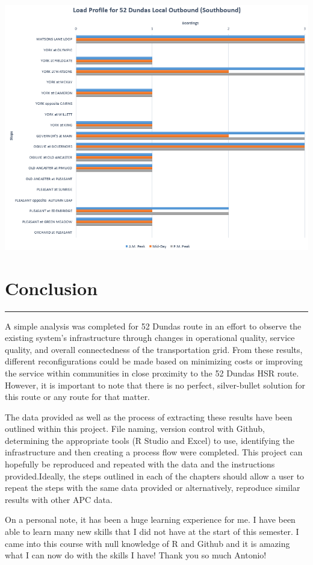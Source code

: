 \documentclass[
11pt, %
oneside, %
english, %
singlespacing, %
]{macthesis} %
\begin{document}
\includegraphics[width=1\linewidth]{figure/Load_Profile_Southbound}

\hypertarget{conclusion}{%
\chapter{Conclusion}\label{conclusion}}
\begin{center}\rule{0.5\linewidth}{0.5pt}\end{center}

A simple analysis was completed for 52 Dundas route in an effort to observe the existing system's infrastructure through changes in operational quality, service quality, and overall connectedness of the transportation grid. From these results, different reconfigurations could be made based on minimizing costs or improving the service within communities in close proximity to the 52 Dundas HSR route. However, it is important to note that there is no perfect, silver-bullet solution for this route or any route for that matter.

The data provided as well as the process of extracting these results have been outlined within this project. File naming, version control with Github, determining the appropriate tools (R Studio and Excel) to use, identifying the infrastructure and then creating a process flow were completed. This project can hopefully be reproduced and repeated with the data and the instructions provided.Ideally, the steps outlined in each of the chapters should allow a user to repeat the steps with the same data provided or alternatively, reproduce similar results with other APC data.

On a personal note, it has been a huge learning experience for me. I have been able to learn many new skills that I did not have at the start of this semester. I came into this course with null knowledge of R and Github and it is amazing what I can now do with the skills I have! Thank you so much Antonio!
\end{document}
